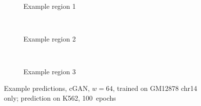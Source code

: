 \begin{figure}[p] %
    \begin{subfigure}{\textwidth}
        \centering
        \caption{Example  region 1} \label{fig:results:GAN64-14single_r1}
    \end{subfigure}\\[3mm]
    \begin{subfigure}{\textwidth}
        \centering
        \caption{Example region 2} \label{fig:results:GAN64-14single_r2}
    \end{subfigure}\\[3mm]
    \begin{subfigure}{\textwidth}
        \centering
        \caption{Example region 3} \label{fig:results:GAN64-14single_r3}
    \end{subfigure}
    \caption{Example predictions, cGAN, $w=64$, trained on GM12878 chr14 only; prediction on K562, 100~epochs} 
     \label{fig:results:GAN64-14single_matrices}
\end{figure}
